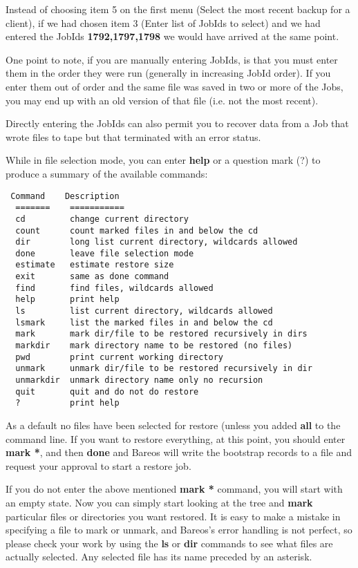 Instead of choosing item 5 on the first menu (Select the most recent backup
for a client), if we had chosen item 3 (Enter list of JobIds to select) and we
had entered the JobIds {\bf 1792,1797,1798} we would have arrived at the same
point.

One point to note, if you are manually entering JobIds, is that you must enter
them in the order they were run (generally in increasing JobId order). If you
enter them out of order and the same file was saved in two or more of the
Jobs, you may end up with an old version of that file (i.e. not the most
recent).

Directly entering the JobIds can also permit you to recover data from
a Job that wrote files to tape but that terminated with an error status.

While in file selection mode, you can enter {\bf help} or a question mark (?)
to produce a summary of the available commands:

\footnotesize
\begin{verbatim}
 Command    Description
  =======    ===========
  cd         change current directory
  count      count marked files in and below the cd
  dir        long list current directory, wildcards allowed
  done       leave file selection mode
  estimate   estimate restore size
  exit       same as done command
  find       find files, wildcards allowed
  help       print help
  ls         list current directory, wildcards allowed
  lsmark     list the marked files in and below the cd
  mark       mark dir/file to be restored recursively in dirs
  markdir    mark directory name to be restored (no files)
  pwd        print current working directory
  unmark     unmark dir/file to be restored recursively in dir
  unmarkdir  unmark directory name only no recursion
  quit       quit and do not do restore
  ?          print help
\end{verbatim}
\normalsize

As a default no files have been selected for restore (unless you
added {\bf all} to the command line. If you want to restore
everything, at this point, you should enter {\bf mark *}, and then {\bf done}
and Bareos will write the bootstrap records to a file and request your
approval to start a restore job.

If you do not enter the above mentioned {\bf mark *} command, you will start
with an empty state. Now you can simply start looking at the tree and {\bf
mark} particular files or directories you want restored. It is easy to make
a mistake in specifying a file to mark or unmark, and Bareos's error handling
is not perfect, so please check your work by using the {\bf ls} or {\bf dir}
commands to see what files are actually selected. Any selected file has its
name preceded by an asterisk.


